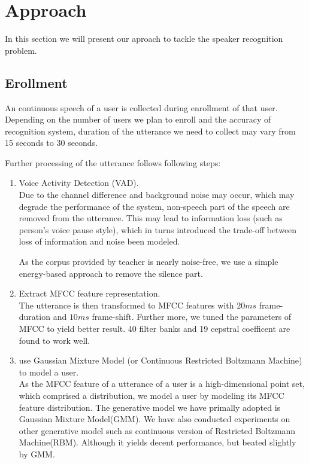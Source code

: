 \section{Approach}
	In this section we will present our aproach to tackle the speaker recognition problem.
\subsection{Erollment}
	\label{sec:approach_enrollment}
	An continuous speech of a user is collected during enrollment of that user. Depending on
	the number of users we plan to enroll and the accuracy of recognition system, duration
	of the utterance we need to collect may vary from 15 seconds to 30 seconds.

	Further processing of the utterance follows following steps:
	\begin{enumerate}
		\item Voice Activity Detection (VAD). \\
			Due to the channel difference and background noise may occur, which
			may degrade the performance of the system, non-speech part of the
			speech are removed from the utterance. This may lead to
			information loss (such as person's voice pause style), which in
			turns introduced the trade-off between loss of information and
			noise been modeled.

			As the corpus provided by teacher is nearly noise-free, we use a
			simple energy-based approach to remove the silence part.

		\item Extract MFCC feature representation. \\
			The utterance is then transformed to MFCC features with $20ms$
			frame-duration and $10ms$ frame-shift. Further more, we tuned the
			parameters of MFCC to yield better result. 40 filter banks and 19
			cepstral coefficent are found to work well.

		\item use Gaussian Mixture Model (or Continuous Restricted Boltzmann Machine) to model a user. \\
			As the MFCC feature of a utterance of a user is a high-dimensional point
			set, which comprised a distribution, we model a user by modeling its
			MFCC feature distribution. The generative model we have primally adopted is
			Gaussian Mixture Model(GMM). We have also conducted experiments on other generative model
			such as continuous version of Restricted Boltzmann Machine(RBM). Although it yields decent
			performance, but beated slightly by GMM.


\end{enumerate}
